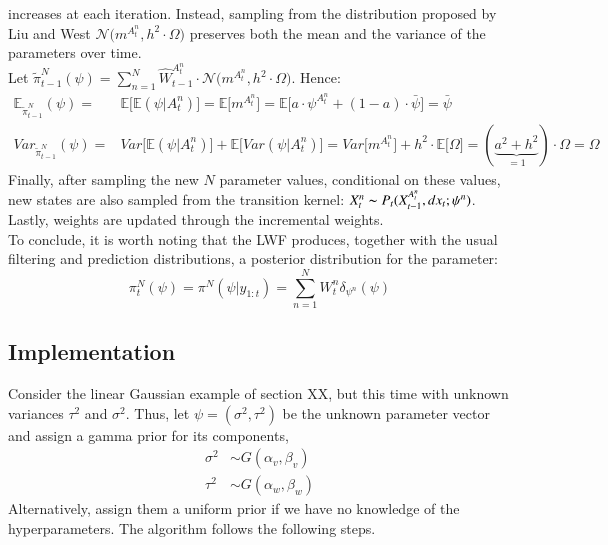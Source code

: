 \documentclass[
]{book}
\theoremstyle{break}
\theoremstyle{nonumberplain}
\begin{document}
increases at each iteration. Instead, sampling from the distribution
proposed by Liu and West
\(\mathcal N\big(m^{A_t^n},h^2\cdot \Omega\big)\) preserves both the
mean and the variance of the parameters over time.\\
Let
\(\tilde \pi_{t-1}^N(\psi)=\sum_{n=1}^N \hat W_{t-1}^{A_t^{n}}\cdot \mathcal N\big(m^{A_t^n},h^2\cdot \Omega\big)\).
Hence: \begin{equation*}
    \begin{split}
        \mathbb E_{\tilde \pi_{t-1}^N} ( \psi)=& \mathbb E\big[\mathbb E( \psi|A_t^{n})\big]=\mathbb E\big[m^{A_t^n}\big]=\mathbb E\big[a\cdot \psi^{A_t^n}+(1-a)\cdot \bar \psi\big]=\bar \psi\\
        Var_{\tilde \pi_{t-1}^N} ( \psi)=&Var\big[\mathbb E( \psi|A_t^{n})\big]+\mathbb E\big[Var( \psi|A_t^{n})\big]=Var\big[m^{A_t^n}\big]+h^2\cdot\mathbb E\big[\Omega\big]=(\underbrace{a^2+h^2}_{=1})\cdot \Omega =\Omega
    \end{split}
\end{equation*} Finally, after sampling the new \(N\) parameter values,
conditional on these values, new states are also sampled from the
transition kernel: \(X_t^n\thicksim P_t(X_{t-1}^{A_t^n},dx_t; \psi^n)\).
Lastly, weights are updated through the incremental weights.~\\
To conclude, it is worth noting that the LWF produces, together with the
usual filtering and prediction distributions, a posterior distribution
for the parameter: \begin{equation}
    \pi^N_{t}(\psi)=\pi^N(\psi|y_{1:t})=\sum_{n=1}^NW_{t}^n\delta_{\psi^n}(\psi)
\end{equation}

\subsection{Implementation}

\hfill\break
Consider the linear Gaussian example of section XX, but this time with
unknown variances \(\tau^{2}\) and \(\sigma^{2}\). Thus, let
\(\psi=(\sigma^{2},\tau^{2})\) be the unknown parameter vector and
assign a gamma prior for its components, \begin{align*}
\sigma^{2}  & \sim G(\alpha_{v},\beta_{v}) \\
\tau^{2}  & \sim G(\alpha_{w},\beta_{w})
\end{align*} Alternatively, assign them a uniform prior if we have no
knowledge of the hyperparameters. The algorithm follows the following
steps.
\end{document}
